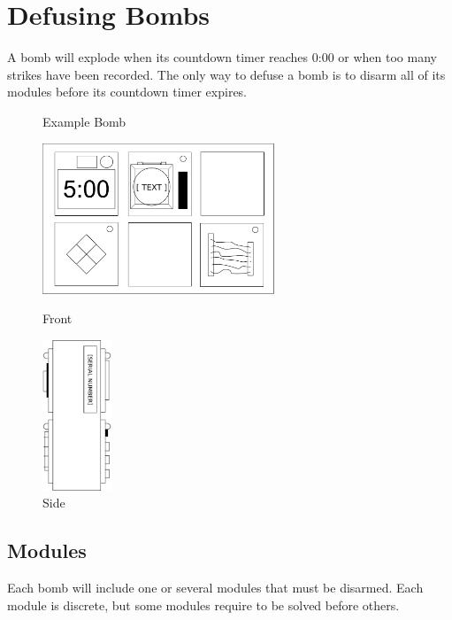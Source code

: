 \documentclass{../../ktane-mod}
\begin{document}
\section*{Defusing Bombs}
A bomb will explode when its countdown timer reaches 0:00 or when too many strikes have been recorded.
The only way to defuse a bomb is to disarm all of its modules before its countdown timer expires.

\begin{figure}[h]
  \centering
  \caption*{Example Bomb}
  \begin{minipage}{.4\textwidth}
    \centering
    \includegraphics[height=4.5cm]{images/bomb_front}
    \caption*{Front}
    \label{fig:sub1}
  \end{minipage}%
  \begin{minipage}{.3\textwidth}
    \centering
    \includegraphics[height=4.5cm]{images/bomb_side}
    \caption*{Side}
    \label{fig:sub2}
  \end{minipage}
\end{figure}

\subsection*{Modules}
Each bomb will include one or several modules that must be disarmed.
Each module is discrete, but some modules require to be solved before others.
\end{document}
